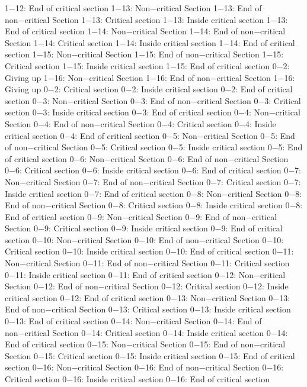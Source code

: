 1−12: End of critical section
1−13: Non−critical Section
1−13: End of non−critical Section
1−13: Critical section
1−13: Inside critical section
1−13: End of critical section
1−14: Non−critical Section
1−14: End of non−critical Section
1−14: Critical section
1−14: Inside critical section
1−14: End of critical section
1−15: Non−critical Section
1−15: End of non−critical Section
1−15: Critical section
1−15: Inside critical section
1−15: End of critical section
0−2: Giving up
1−16: Non−critical Section
1−16: End of non−critical Section
1−16: Giving up
0−2: Critical section
0−2: Inside critical section
0−2: End of critical section
0−3: Non−critical Section
0−3: End of non−critical Section
0−3: Critical section
0−3: Inside critical section
0−3: End of critical section
0−4: Non−critical Section
0−4: End of non−critical Section
0−4: Critical section
0−4: Inside critical section
0−4: End of critical section
0−5: Non−critical Section
0−5: End of non−critical Section
0−5: Critical section
0−5: Inside critical section
0−5: End of critical section
0−6: Non−critical Section
0−6: End of non−critical Section
0−6: Critical section
0−6: Inside critical section
0−6: End of critical section
0−7: Non−critical Section
0−7: End of non−critical Section
0−7: Critical section
0−7: Inside critical section
0−7: End of critical section
0−8: Non−critical Section
0−8: End of non−critical Section
0−8: Critical section
0−8: Inside critical section
0−8: End of critical section
0−9: Non−critical Section
0−9: End of non−critical Section
0−9: Critical section
0−9: Inside critical section
0−9: End of critical section
0−10: Non−critical Section
0−10: End of non−critical Section
0−10: Critical section
0−10: Inside critical section
0−10: End of critical section
0−11: Non−critical Section
0−11: End of non−critical Section
0−11: Critical section
0−11: Inside critical section
0−11: End of critical section
0−12: Non−critical Section
0−12: End of non−critical Section
0−12: Critical section
0−12: Inside critical section
0−12: End of critical section
0−13: Non−critical Section
0−13: End of non−critical Section
0−13: Critical section
0−13: Inside critical section
0−13: End of critical section
0−14: Non−critical Section
0−14: End of non−critical Section
0−14: Critical section
0−14: Inside critical section
0−14: End of critical section
0−15: Non−critical Section
0−15: End of non−critical Section
0−15: Critical section
0−15: Inside critical section
0−15: End of critical section
0−16: Non−critical Section
0−16: End of non−critical Section
0−16: Critical section
0−16: Inside critical section
0−16: End of critical section
